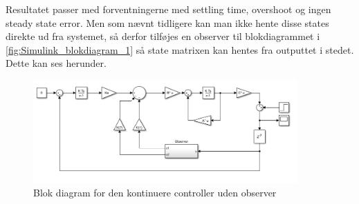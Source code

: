 Resultatet passer med forventningerne med settling time, overshoot og ingen steady state error. Men som nævnt tidligere kan man ikke hente disse states direkte ud fra systemet, så derfor tilføjes en observer til blokdiagrammet i \autoref{fig:Simulink_blokdiagram_1} så state matrixen kan hentes fra outputtet i stedet. Dette kan ses herunder.

\begin{figure}[H]
	\centering
	\includegraphics[width = 0.9\textwidth]{figur/Simulink_blokdiagram_2}
	\caption{Blok diagram for den kontinuere controller uden observer}
	\label{fig:Simulink_blokdiagram_2}
\end{figure}